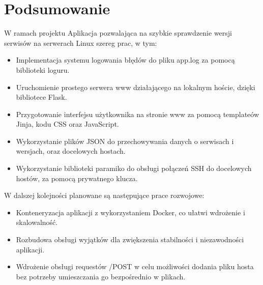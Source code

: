 \chapter{Podsumowanie}
W ramach projektu Aplikacja pozwalająca na szybkie sprawdzenie wersji serwisów na serwerach Linux szereg prac, w tym:
\begin{itemize}
    \item Implementacja systemu logowania błędów do pliku app.log za pomocą biblioteki loguru.
    \item Uruchomienie prostego serwera www działającego na lokalnym hoście, dzięki bibliotece Flask.
    \item Przygotowanie interfejsu użytkownika na stronie www za pomocą templateów Jinja, kodu CSS oraz JavaScript.
    \item Wykorzystanie plików JSON do przechowywania danych o serwisach i wersjach, oraz docelowych hostach.
    \item Wykorzystanie biblioteki paramiko do obsługi połączeń SSH do docelowych hostów, za pomocą prywatnego klucza.
\end{itemize}


W dalszej kolejności planowane są następujące prace rozwojowe:
\begin{itemize}
    \item Konteneryzacja aplikacji z wykorzystaniem Docker, co ułatwi wdrożenie i skalowalność.
    \item Rozbudowa obsługi wyjątków dla zwiększenia stabilności i niezawodności aplikacji.
    \item Wdrożenie obsługi requestów /POST w celu możliwości dodania pliku hosta bez potrzeby umieszczania go bezpośrednio w plikach.
\end{itemize}
